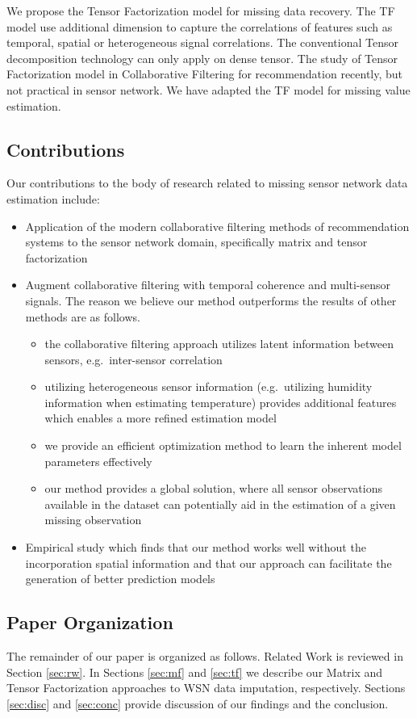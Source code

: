 We propose the Tensor Factorization model for missing data recovery. The TF model use additional dimension to capture the correlations of features such as temporal, spatial or heterogeneous signal correlations. The conventional Tensor decomposition technology can only apply on dense tensor. The study of Tensor Factorization model in Collaborative Filtering for recommendation recently, but not practical in sensor network. We  have adapted the TF model for missing value estimation. 

\subsection{Contributions }
Our contributions to the body of research related to missing sensor network data estimation include:
\begin{itemize}
\item Application of the modern collaborative filtering methods of recommendation systems to the sensor network domain, specifically matrix and tensor factorization
\item Augment collaborative filtering with temporal coherence and multi-sensor signals. The reason we believe our method outperforms the results of other methods are as follows.
\begin{itemize}
\item the collaborative filtering approach utilizes latent information between sensors, e.g.\ inter-sensor correlation
\item utilizing heterogeneous sensor information (e.g.\ utilizing humidity information when estimating temperature) provides additional features which enables a more refined estimation model
\item we provide an efficient optimization method to learn the inherent model parameters effectively
\item our method provides a global solution, where all sensor observations available in the dataset can potentially aid in the estimation of a given missing observation
\end{itemize}
\item Empirical study which finds that our method works well without the incorporation spatial information and that our approach can facilitate the generation of better prediction models
\end{itemize}

\subsection{Paper Organization }
The remainder of our paper is organized as follows.
Related Work is reviewed in Section \ref{sec:rw}.
In Sections \ref{sec:mf} and \ref{sec:tf} we describe our Matrix and Tensor Factorization approaches to WSN data imputation, respectively.
Sections \ref{sec:disc} and \ref{sec:conc} provide discussion of our findings and the conclusion.
